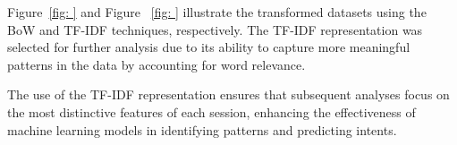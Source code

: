         Figure~\ref{fig: } and Figure ~\ref{fig: } illustrate the transformed datasets using the BoW and TF-IDF techniques, respectively. The TF-IDF representation was selected for further analysis due to its ability to capture more meaningful patterns in the data by accounting for word relevance.


        The use of the TF-IDF representation ensures that subsequent analyses focus on the most distinctive features of each session, enhancing the effectiveness of machine learning models in identifying patterns and predicting intents.
        
    \clearpage %
